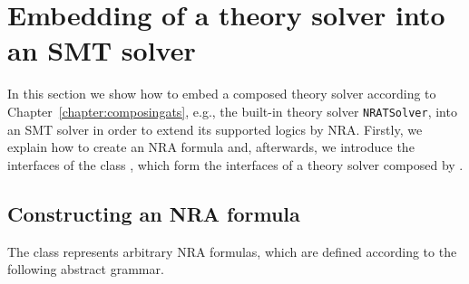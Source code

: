 \chapter{Embedding of a theory solver into an SMT solver}
\label{chapter:embeddingats}
In this section we show how to embed a composed theory solver according
to Chapter~\ref{chapter:composingats}, e.g., the built-in theory 
solver \texttt{NRATSolver}, into an SMT solver in order to 
extend its supported logics by NRA. Firstly, we explain how to
create an NRA formula and, afterwards, we introduce the 
interfaces of the class \managerClass, which form the interfaces of
a theory solver composed by \smtrat.

\section{Constructing an NRA formula}
The class \formulaClass represents arbitrary NRA formulas, which are
defined according to the following abstract grammar.

